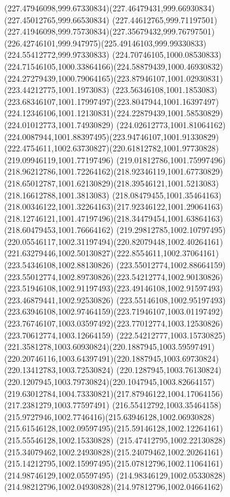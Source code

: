 {{  \curveto(227.47946098,999.67330834)(227.46479431,999.66930834)(227.45012765,999.66530834)
  \curveto(227.44612765,999.71197501)(227.41946098,999.75730834)(227.35679432,999.76797501)
  \curveto(226.42746101,999.947975)(225.49146103,999.99330833)(224.55412772,999.97330833)
  \curveto(224.70746105,1000.08530833)(224.71546105,1000.33864166)(224.58879439,1000.46930832)
  \curveto(224.27279439,1000.79064165)(223.87946107,1001.02930831)(223.44212775,1001.1973083)
  \curveto(223.56346108,1001.1853083)(223.68346107,1001.17997497)(223.8047944,1001.16397497)
  \curveto(224.12346106,1001.12130831)(224.22879439,1001.58530829)(224.01012773,1001.74930829)
  \curveto(224.02612773,1001.81064162)(224.0087944,1001.88397495)(223.94746107,1001.91330829)
  \curveto(222.4754611,1002.63730827)(220.61812782,1001.97730828)(219.09946119,1001.77197496)
  \curveto(219.01812786,1001.75997496)(218.96212786,1001.72264162)(218.92346119,1001.67730829)
  \curveto(218.65012787,1001.62130829)(218.39546121,1001.5213083)(218.16612788,1001.3813083)
  \curveto(218.08479455,1001.35464163)(218.00346122,1001.32264163)(217.92346122,1001.29064163)
  \curveto(218.12746121,1001.47197496)(218.34479454,1001.63864163)(218.60479453,1001.76664162)
  \curveto(219.29812785,1002.10797495)(220.05546117,1002.31197494)(220.82079448,1002.40264161)
  \curveto(221.63279446,1002.50130827)(222.8554611,1002.37064161)(223.54346108,1002.88130826)
  \curveto(223.55012774,1002.88664159)(223.55012774,1002.89730826)(223.54212774,1002.90130826)
  \curveto(223.51946108,1002.91197493)(223.49146108,1002.91597493)(223.46879441,1002.92530826)
  \curveto(223.55146108,1002.95197493)(223.63946108,1002.97464159)(223.71946107,1003.01197492)
  \curveto(223.76746107,1003.03597492)(223.77012774,1003.12530826)(223.70612774,1003.12664159)
  \curveto(222.54212777,1003.15730825)(221.3581278,1003.60930824)(220.1887945,1003.59597491)
  \curveto(220.20746116,1003.64397491)(220.1887945,1003.69730824)(220.13412783,1003.72530824)
  \curveto(220.1287945,1003.76130824)(220.1207945,1003.79730824)(220.1047945,1003.82664157)
  \curveto(219.63012784,1004.73330821)(217.87946122,1004.17064156)(217.2381279,1003.77597491)
  \curveto(216.55412792,1003.35464158)(215.9727946,1002.7746416)(215.63946128,1002.06930828)
  \curveto(215.61546128,1002.09597495)(215.59146128,1002.12264161)(215.55546128,1002.15330828)
  \curveto(215.47412795,1002.22130828)(215.34079462,1002.24930828)(215.24079462,1002.20264161)
  \curveto(215.14212795,1002.15997495)(215.07812796,1002.11064161)(214.98746129,1002.05597495)
  \curveto(214.98346129,1002.05330828)(214.98212796,1002.04930828)(214.97812796,1002.04664162)
}}
